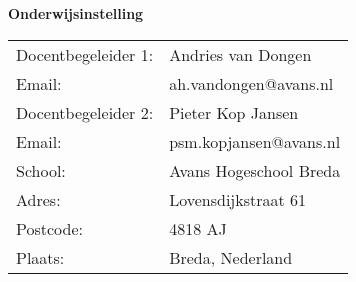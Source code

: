 \noindent\textbf{Onderwijsinstelling}
\begin{table}[h!]
	\begin{tabular}{p{5cm}l}
	Docentbegeleider 1: & Andries van Dongen          \\
	Email:              & ah.vandongen@avans.nl       \\
	Docentbegeleider 2: & Pieter Kop Jansen           \\
	Email:              & psm.kopjansen@avans.nl      \\
	School:             & Avans Hogeschool Breda      \\
	Adres:				& Lovensdijkstraat 61		\\
	Postcode:			& 4818 AJ					\\
	Plaats:				& Breda, Nederland			\\
	\end{tabular}
\end{table}